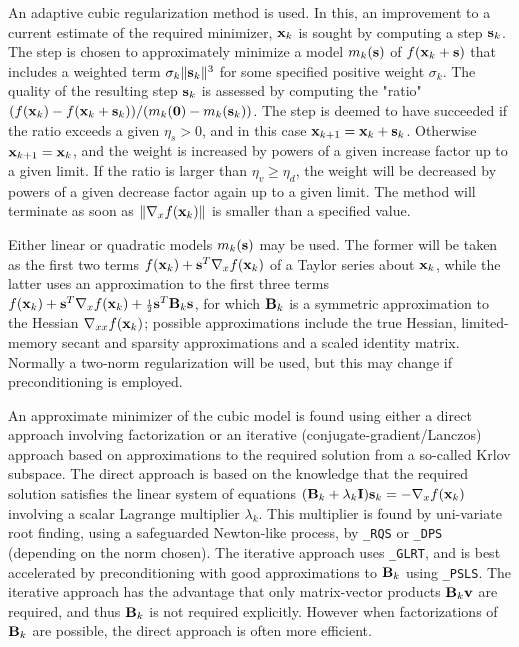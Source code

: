 \documentclass{galahad}
\begin{document}

\galmethod
An adaptive cubic regularization method is used.
In this, an improvement to a current
estimate of the required minimizer, ${\mathbf{x}}_k$ is sought by computing a
step ${\mathbf{s}}_k$. The step is chosen to approximately minimize a model $m_k({\mathbf{s}})$
of $f({\mathbf{x}}_k + {\mathbf{s}})$ that includes a weighted term $\sigma_k \|{\mathbf{s}}_k\|^3$
for some specified positive weight $\sigma_k$. The quality of the
resulting step ${\mathbf{s}}_k$ is assessed by computing the "ratio"
$(f({\mathbf{x}}_k) - f({\mathbf{x}}_k + {\mathbf{s}}_k))/ (m_k({\mathbf{0}}) - m_k({\mathbf{s}}_k))$.
The step is deemed to have succeeded if the ratio exceeds a given $\eta_s > 0$,
and in this case ${\mathbf{x}}_{k+1} = {\mathbf{x}}_k + {\mathbf{s}}_k$. Otherwise
${\mathbf{x}}_{k+1} = {\mathbf{x}}_k$, and the weight is increased by powers of a given
increase factor up to a given limit. If the ratio is larger than
$\eta_v \geq \eta_d$, the weight will be decreased by powers of a given
decrease factor again up to a given limit. The method will terminate
as soon as $\|\nabla_x f({\mathbf{x}}_k)\|$ is smaller than a specified value.

Either linear or quadratic models $m_k({\mathbf{s}})$ may be used. The former will be
taken as the first two terms $f({\mathbf{x}}_k) + {\mathbf{s}}^T \nabla_x f({\mathbf{x}}_k)$
of a Taylor series about ${\mathbf{x}}_k$, while the latter uses an
approximation to the first three terms
$f({\mathbf{x}}_k) + {\mathbf{s}}^T \nabla_x f({\mathbf{x}}_k) + {\scriptstyle \frac{1}{2}}
{\mathbf{s}}^T {\mathbf{B}}_k {\mathbf{s}}$,
for which ${\mathbf{B}}_k$ is a symmetric approximation to the Hessian
$\nabla_{xx} f({\mathbf{x}}_k)$; possible approximations include the true Hessian,
limited-memory secant and sparsity approximations and a scaled identity matrix.
Normally a two-norm regularization will be used, but this may change
if preconditioning is employed.

An approximate minimizer of the cubic model
is found using either a direct approach involving factorization or an
iterative (conjugate-gradient/Lanczos) approach based on approximations
to the required solution from a so-called Krlov subspace. The direct
approach is based on the knowledge that the required solution
satisfies the linear system of equations $({\mathbf{B}}_k + \lambda_k {\mathbf{I}}) {\mathbf{s}}_k
= - \nabla_x f({\mathbf{x}}_k)$ involving a scalar Lagrange multiplier $\lambda_k$.
This multiplier is found by uni-variate root finding, using a safeguarded
Newton-like process, by {\tt \libraryname\_RQS} or {\tt \libraryname\_DPS}
(depending on the norm chosen). The iterative approach
uses {\tt \libraryname\_GLRT}, and is best accelerated by preconditioning
with good approximations to ${\mathbf{B}}_k$ using {\tt \libraryname\_PSLS}. The
iterative approach has the advantage that only matrix-vector products
${\mathbf{B}}_k {\mathbf{v}}$ are required, and thus ${\mathbf{B}}_k$ is not required explicitly.
However when factorizations of ${\mathbf{B}}_k$ are possible, the direct approach
is often more efficient.
\vspace*{1mm}
\end{document}
